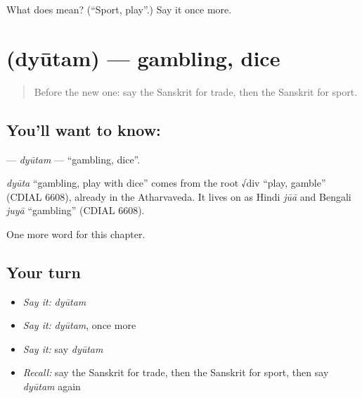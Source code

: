 \begin{tcolorbox}[breakable,colback=teal!4,colframe=teal!35!black,title={Before you move on}]
What does  mean? (\textquotedblleft{}Sport, play\textquotedblright{}.) Say it once more.
\end{tcolorbox}
\section[\texorpdfstring{\sk{द्यूतम्} (dyūtam)}{द्यूतम् (dyūtam)}]{ (dyūtam) — gambling, dice}

\label{lesson:SA-C163-dyutam}



\begin{quote}
Before the new one: say the Sanskrit for trade, then the Sanskrit for sport.
\end{quote}

\subsection*{You'll want to know: }
\textbf{} — \emph{dyūtam} — \textquotedblleft{}gambling, dice\textquotedblright{}.

\begin{cousinweb}
\emph{dyūta} \textquotedblleft{}gambling, play with dice\textquotedblright{} comes from the root √div \textquotedblleft{}play, gamble\textquotedblright{} (CDIAL 6608), already in the Atharvaveda. It lives on as Hindi \emph{jūā} and Bengali \emph{juyā} \textquotedblleft{}gambling\textquotedblright{} (CDIAL 6608).
\end{cousinweb}

\begin{grammarlens}[title={What you've built}]
One more word for this chapter.
\end{grammarlens}

\subsection*{Your turn}
\begin{itemize}
\raggedright
  \item \emph{Say it:} \emph{dyūtam}
  \item \emph{Say it:} \emph{dyūtam}, once more
  \item \emph{Say it:} say \emph{dyūtam}
  \item \emph{Recall:} say the Sanskrit for trade, then the Sanskrit for sport, then say \emph{dyūtam} again
\end{itemize}

